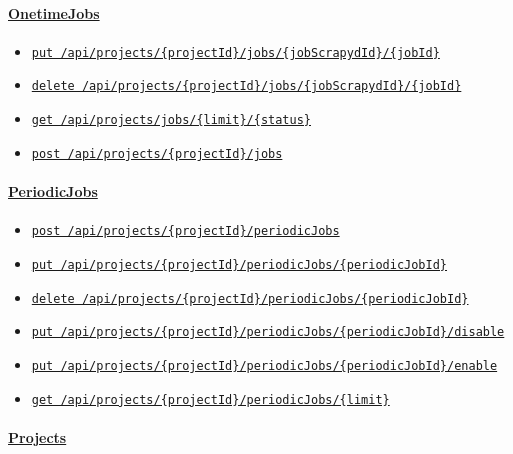 {\hypertarget{onetimejobs}{%
\paragraph{\texorpdfstring{\protect\hyperlink{OnetimeJobs}{OnetimeJobs}}{OnetimeJobs}}\label{onetimejobs}}

\begin{itemize}
\tightlist
\item
  \protect\hyperlink{cancel}{\texttt{put\ /api/projects/\{projectId\}/jobs/\{jobScrapydId\}/\{jobId\}}}
\item
  \protect\hyperlink{deleteJob}{\texttt{delete\ /api/projects/\{projectId\}/jobs/\{jobScrapydId\}/\{jobId\}}}
\item
  \protect\hyperlink{getJobsExecutions}{\texttt{get\ /api/projects/jobs/\{limit\}/\{status\}}}
\item
  \protect\hyperlink{schedule}{\texttt{post\ /api/projects/\{projectId\}/jobs}}
\end{itemize}

\hypertarget{periodicjobs}{%
\paragraph{\texorpdfstring{\protect\hyperlink{PeriodicJobs}{PeriodicJobs}}{PeriodicJobs}}\label{periodicjobs}}

\begin{itemize}
\tightlist
\item
  \protect\hyperlink{addPeriodicJob}{\texttt{post\ /api/projects/\{projectId\}/periodicJobs}}
\item
  \protect\hyperlink{changePeriodicJob}{\texttt{put\ /api/projects/\{projectId\}/periodicJobs/\{periodicJobId\}}}
\item
  \protect\hyperlink{deletePeriodicJob}{\texttt{delete\ /api/projects/\{projectId\}/periodicJobs/\{periodicJobId\}}}
\item
  \protect\hyperlink{disable}{\texttt{put\ /api/projects/\{projectId\}/periodicJobs/\{periodicJobId\}/disable}}
\item
  \protect\hyperlink{enable}{\texttt{put\ /api/projects/\{projectId\}/periodicJobs/\{periodicJobId\}/enable}}
\item
  \protect\hyperlink{getPeriodicJobs}{\texttt{get\ /api/projects/\{projectId\}/periodicJobs/\{limit\}}}
\end{itemize}

\hypertarget{projects}{%
\paragraph{\texorpdfstring{\protect\hyperlink{Projects}{Projects}}{Projects}}\label{projects}}

}
